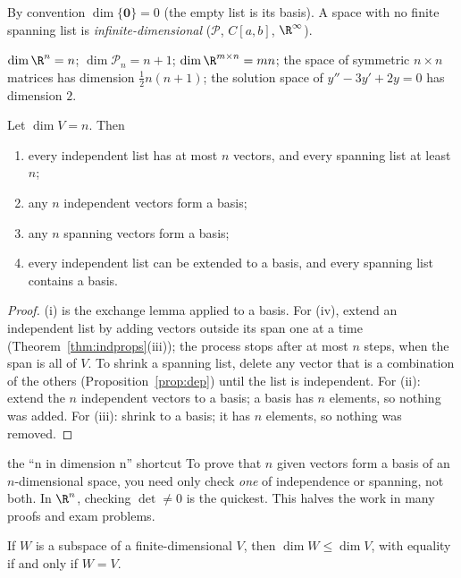 By convention $\dim\{\mathbf{0}\}=0$ (the empty list is its basis). A space with no finite spanning list is \emph{infinite-dimensional} ($\mathcal{P}$, $C[a,b]$, $\R^\infty$).

\begin{example}
$\dim\R^n=n$; $\dim\mathcal{P}_n=n+1$; $\dim\R^{m\times n}=mn$; the space of symmetric $n\times n$ matrices has dimension $\tfrac12n(n+1)$; the solution space of $y''-3y'+2y=0$ has dimension $2$.
\end{example}

\begin{theorem}\label{thm:count}
Let $\dim V=n$. Then
\begin{enumerate}[label=(\roman*)]
  \item every independent list has at most $n$ vectors, and every spanning list at least $n$;
  \item any $n$ independent vectors form a basis;
  \item any $n$ spanning vectors form a basis;
  \item every independent list can be extended to a basis, and every spanning list contains a basis.
\end{enumerate}
\end{theorem}

\begin{proof}
(i) is the exchange lemma applied to a basis. For (iv), extend an independent list by adding vectors outside its span one at a time (Theorem~\ref{thm:indprops}(iii)); the process stops after at most $n$ steps, when the span is all of $V$. To shrink a spanning list, delete any vector that is a combination of the others (Proposition~\ref{prop:dep}) until the list is independent. For (ii): extend the $n$ independent vectors to a basis; a basis has $n$ elements, so nothing was added. For (iii): shrink to a basis; it has $n$ elements, so nothing was removed.
\end{proof}

\begin{interview}{the ``n in dimension n'' shortcut}
To prove that $n$ given vectors form a basis of an $n$-dimensional space, you need only check \emph{one} of independence or spanning, not both. In $\R^n$, checking $\det\ne0$ is the quickest. This halves the work in many proofs and exam problems.
\end{interview}

\begin{theorem}\label{thm:subdim}
If $W$ is a subspace of a finite-dimensional $V$, then $\dim W\le\dim V$, with equality if and only if $W=V$.
\end{theorem}

